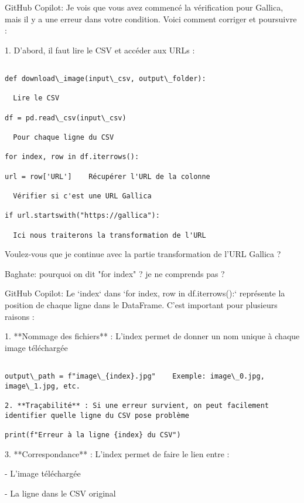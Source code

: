 GitHub Copilot: Je vois que vous avez commencé la vérification pour Gallica, mais il y a une erreur dans votre condition. Voici comment corriger et poursuivre :

1. D'abord, il faut lire le CSV et accéder aux URLs :

\begin{verbatim}

def download\_image(input\_csv, output\_folder):

  Lire le CSV

df = pd.read\_csv(input\_csv)

  Pour chaque ligne du CSV

for index, row in df.iterrows():

url = row['URL']    Récupérer l'URL de la colonne

  Vérifier si c'est une URL Gallica

if url.startswith("https://gallica"):

  Ici nous traiterons la transformation de l'URL

\end{verbatim}

Voulez-vous que je continue avec la partie transformation de l'URL Gallica ?

Baghate: pourquoi on dit "for index" ? je ne comprends pas ?

GitHub Copilot: Le `index` dans `for index, row in df.iterrows():` représente la position de chaque ligne dans le DataFrame. C'est important pour plusieurs raisons :

1. **Nommage des fichiers** : L'index permet de donner un nom unique à chaque image téléchargée

\begin{verbatim}

output\_path = f"image\_{index}.jpg"    Exemple: image\_0.jpg, image\_1.jpg, etc.

2. **Traçabilité** : Si une erreur survient, on peut facilement identifier quelle ligne du CSV pose problème

print(f"Erreur à la ligne {index} du CSV")

\end{verbatim}

3. **Correspondance** : L'index permet de faire le lien entre :

- L'image téléchargée

- La ligne dans le CSV original

